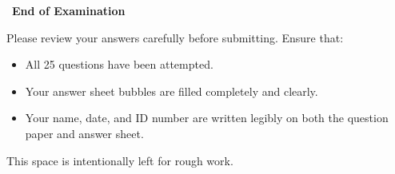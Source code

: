 \documentclass[11pt,a4paper]{article}
\begin{document}
\begin{tcolorbox}[
  colback=AccentGold!6,
  colframe=AccentGold!40,
  boxrule=0.7pt,
  sharp corners,
  left=16pt,
  right=16pt,
  top=10pt,
  bottom=10pt,
]
{\color{NavyBlue}\Large\faCheckCircle\ \textbf{End of Examination}}
\vspace{4pt}

\noindent\small Please review your answers carefully before submitting. Ensure that:
\begin{itemize}[nosep,leftmargin=18pt,itemsep=1pt,topsep=2pt]
  \item All 25 questions have been attempted.
  \item Your answer sheet bubbles are filled completely and clearly.
  \item Your name, date, and ID number are written legibly on both the question paper and answer sheet.
\end{itemize}
\end{tcolorbox}

\vspace{8pt}

\noindent{\color{BorderGray}\hrule}
\vspace{6pt}
{\centering\color{BorderGray}\footnotesize This space is intentionally left for rough work.\par}
\end{document}
